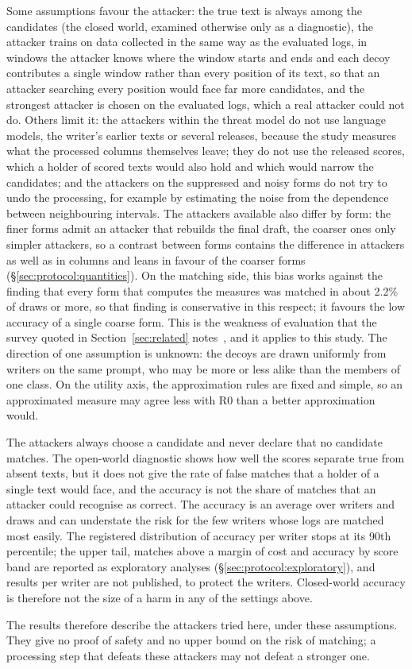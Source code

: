 Some assumptions favour the attacker: the true text is always among the candidates (the closed world, examined
otherwise only as a diagnostic), the attacker trains on data collected in the same way as the evaluated logs, in
windows the attacker knows where the window starts and ends and each decoy contributes a single window rather than
every position of its text, so that an attacker searching every position would face far more candidates, and the strongest attacker is chosen
on the evaluated logs, which a real attacker could not do. Others limit it: the attackers within the threat model do
not use language models, the writer's earlier texts or several releases, because the study measures what the processed
columns themselves leave; they do not use the released scores, which a holder of scored texts would also hold and
which would narrow the candidates; and the attackers on the suppressed and noisy forms do not try to undo the
processing, for example by estimating the noise from the dependence between neighbouring intervals. The attackers
available also differ by form: the finer forms admit an attacker that rebuilds the final draft, the coarser ones only
simpler attackers, so a contrast between forms contains the difference in attackers as well as in columns and leans
in favour of the coarser forms (\S\ref{sec:protocol:quantities}). On the matching side, this bias works against the
finding that every form that computes the measures was matched in about 2.2\% of draws or more, so that finding is
conservative in this respect; it favours the low accuracy of a single coarse form. This is the weakness of evaluation that the survey
quoted in Section~\ref{sec:related} notes~\cite{hanisch2021survey}, and it applies to this study. The direction of one assumption is unknown: the
decoys are drawn uniformly from writers on the same prompt, who may be more or less alike than the members of one
class. On the utility axis, the approximation rules are fixed and simple, so an approximated measure may agree less
with R0 than a better approximation would.

The attackers always choose a candidate and never declare that no candidate matches. The open-world diagnostic shows
how well the scores separate true from absent texts, but it does not give the rate of false matches that a holder of a
single text would face, and the accuracy is not the share of matches that an attacker could recognise as correct. The
accuracy is an average over writers and draws and can understate the risk for the few writers whose logs are matched
most easily. The registered distribution of accuracy per writer stops at its 90th percentile; the upper tail, matches
above a margin of cost and accuracy by score band are reported as exploratory analyses (\S\ref{sec:protocol:exploratory}),
and results per writer are not published, to protect the writers. Closed-world accuracy is therefore not the size of a
harm in any of the settings above.

The results therefore describe the attackers tried here, under these assumptions. They give no proof of safety and no
upper bound on the risk of matching; a processing step that defeats these attackers may not defeat a stronger one.
